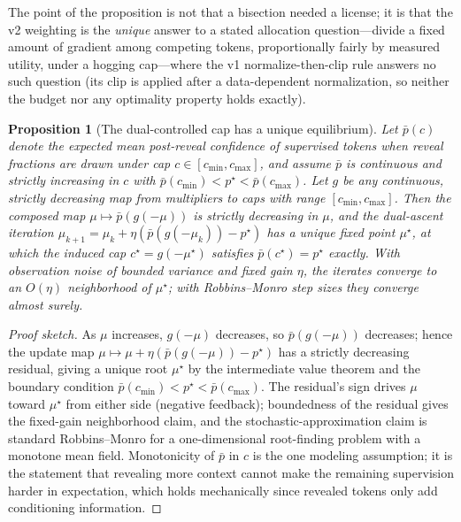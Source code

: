 \documentclass{article} %
\newtheorem{proposition}{Proposition}
\begin{document}
The point of the proposition is not that a bisection needed a license; it is that the v2 weighting is the \emph{unique} answer to a stated allocation question---divide a fixed amount of gradient among competing tokens, proportionally fairly by measured utility, under a hogging cap---where the v1 normalize-then-clip rule answers no such question (its clip is applied after a data-dependent normalization, so neither the budget nor any optimality property holds exactly).

\begin{proposition}[The dual-controlled cap has a unique equilibrium]
\label{prop:dual}
Let $\bar p(c)$ denote the expected mean post-reveal confidence of supervised tokens when reveal fractions are drawn under cap $c \in [c_{\min}, c_{\max}]$, and assume $\bar p$ is continuous and strictly increasing in $c$ with $\bar p(c_{\min}) < p^\star < \bar p(c_{\max})$. Let $g$ be any continuous, strictly decreasing map from multipliers to caps with range $[c_{\min}, c_{\max}]$. Then the composed map $\mu \mapsto \bar p(g(-\mu))$ is strictly decreasing in $\mu$, and the dual-ascent iteration $\mu_{k+1} = \mu_k + \eta(\bar p(g(-\mu_k)) - p^\star)$ has a unique fixed point $\mu^\star$, at which the induced cap $c^\star = g(-\mu^\star)$ satisfies $\bar p(c^\star) = p^\star$ exactly. With observation noise of bounded variance and fixed gain $\eta$, the iterates converge to an $O(\eta)$ neighborhood of $\mu^\star$; with Robbins--Monro step sizes they converge almost surely.
\end{proposition}

\begin{proof}[Proof sketch]
As $\mu$ increases, $g(-\mu)$ decreases, so $\bar p(g(-\mu))$ decreases; hence the update map $\mu \mapsto \mu + \eta(\bar p(g(-\mu)) - p^\star)$ has a strictly decreasing residual, giving a unique root $\mu^\star$ by the intermediate value theorem and the boundary condition $\bar p(c_{\min}) < p^\star < \bar p(c_{\max})$. The residual's sign drives $\mu$ toward $\mu^\star$ from either side (negative feedback); boundedness of the residual gives the fixed-gain neighborhood claim, and the stochastic-approximation claim is standard Robbins--Monro for a one-dimensional root-finding problem with a monotone mean field. Monotonicity of $\bar p$ in $c$ is the one modeling assumption; it is the statement that revealing more context cannot make the remaining supervision harder in expectation, which holds mechanically since revealed tokens only add conditioning information.
\end{proof}
\end{document}

